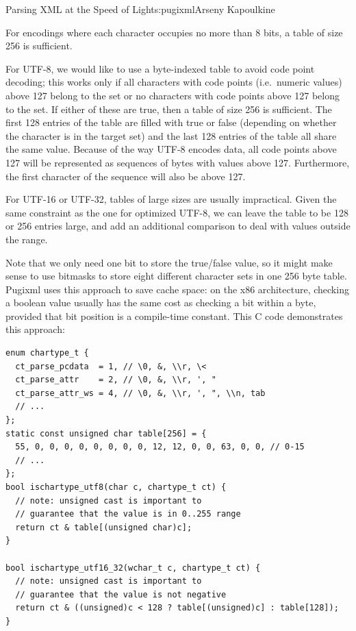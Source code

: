 \begin{aosachapter}{Parsing XML at the Speed of Light}{s:pugixml}{Arseny Kapoulkine}
\begin{aosaitemize}
\item
  For encodings where each character occupies no more than 8 bits, a
  table of size 256 is sufficient.
\item
  For UTF-8, we would like to use a byte-indexed table to avoid code
  point decoding; this works only if all characters with code points
  (i.e.~numeric values) above 127 belong to the set or no characters
  with code points above 127 belong to the set. If either of these are
  true, then a table of size 256 is sufficient. The first 128 entries of
  the table are filled with true or false (depending on whether the
  character is in the target set) and the last 128 entries of the table
  all share the same value. Because of the way UTF-8 encodes data, all
  code points above 127 will be represented as sequences of bytes with
  values above 127. Furthermore, the first character of the sequence
  will also be above 127.
\item
  For UTF-16 or UTF-32, tables of large sizes are usually impractical.
  Given the same constraint as the one for optimized UTF-8, we can leave
  the table to be 128 or 256 entries large, and add an additional
  comparison to deal with values outside the range.
\end{aosaitemize}

Note that we only need one bit to store the true/false value, so it
might make sense to use bitmasks to store eight different character sets
in one 256 byte table. Pugixml uses this approach to save cache space:
on the x86 architecture, checking a boolean value usually has the same
cost as checking a bit within a byte, provided that bit position is a
compile-time constant. This C code demonstrates this approach:

\begin{verbatim}
enum chartype_t {
  ct_parse_pcdata  = 1, // \0, &, \\r, \<
  ct_parse_attr    = 2, // \0, &, \\r, ', "
  ct_parse_attr_ws = 4, // \0, &, \\r, ', ", \\n, tab
  // ...
};
static const unsigned char table[256] = {
  55, 0, 0, 0, 0, 0, 0, 0, 0, 12, 12, 0, 0, 63, 0, 0, // 0-15
  // ...
};
bool ischartype_utf8(char c, chartype_t ct) {
  // note: unsigned cast is important to
  // guarantee that the value is in 0..255 range
  return ct & table[(unsigned char)c];
}

bool ischartype_utf16_32(wchar_t c, chartype_t ct) {
  // note: unsigned cast is important to
  // guarantee that the value is not negative
  return ct & ((unsigned)c < 128 ? table[(unsigned)c] : table[128]);
}
\end{verbatim}


\end{aosachapter}

